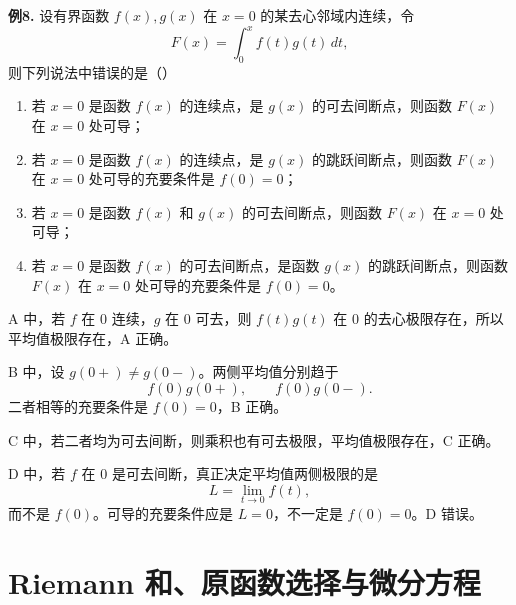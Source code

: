 \begin{problemblock}
\textbf{例8.} 设有界函数 \(f(x),g(x)\) 在 \(x=0\) 的某去心邻域内连续，令
\[
F(x)=\int_0^x f(t)g(t)\,dt,
\]
则下列说法中错误的是（\quad）
\begin{enumerate}[label=\Alph*., leftmargin=2.2em]
\item 若 \(x=0\) 是函数 \(f(x)\) 的连续点，是 \(g(x)\) 的可去间断点，则函数 \(F(x)\) 在 \(x=0\) 处可导；
\item 若 \(x=0\) 是函数 \(f(x)\) 的连续点，是 \(g(x)\) 的跳跃间断点，则函数 \(F(x)\) 在 \(x=0\) 处可导的充要条件是 \(f(0)=0\)；
\item 若 \(x=0\) 是函数 \(f(x)\) 和 \(g(x)\) 的可去间断点，则函数 \(F(x)\) 在 \(x=0\) 处可导；
\item 若 \(x=0\) 是函数 \(f(x)\) 的可去间断点，是函数 \(g(x)\) 的跳跃间断点，则函数 \(F(x)\) 在 \(x=0\) 处可导的充要条件是 \(f(0)=0\)。
\end{enumerate}
\end{problemblock}
\begin{solutionblock}
A 中，若 \(f\) 在 \(0\) 连续，\(g\) 在 \(0\) 可去，则 \(f(t)g(t)\) 在 \(0\) 的去心极限存在，所以平均值极限存在，A 正确。

B 中，设 \(g(0+)\ne g(0-)\)。两侧平均值分别趋于
\[
f(0)g(0+),\qquad f(0)g(0-).
\]
二者相等的充要条件是 \(f(0)=0\)，B 正确。

C 中，若二者均为可去间断，则乘积也有可去极限，平均值极限存在，C 正确。

D 中，若 \(f\) 在 \(0\) 是可去间断，真正决定平均值两侧极限的是
\[
L=\lim_{t\to0}f(t),
\]
而不是 \(f(0)\)。可导的充要条件应是 \(L=0\)，不一定是 \(f(0)=0\)。D 错误。
\end{solutionblock}

\section{Riemann 和、原函数选择与微分方程}

